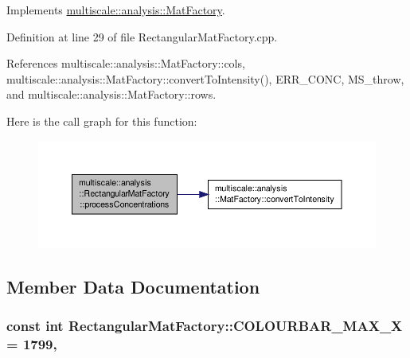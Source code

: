 Implements \hyperlink{classmultiscale_1_1analysis_1_1MatFactory_a0493c87d7b74619a95f14c0e31a3e178}{multiscale\-::analysis\-::\-Mat\-Factory}.



Definition at line 29 of file Rectangular\-Mat\-Factory.\-cpp.



References multiscale\-::analysis\-::\-Mat\-Factory\-::cols, multiscale\-::analysis\-::\-Mat\-Factory\-::convert\-To\-Intensity(), E\-R\-R\-\_\-\-C\-O\-N\-C, M\-S\-\_\-throw, and multiscale\-::analysis\-::\-Mat\-Factory\-::rows.



Here is the call graph for this function\-:\nopagebreak
\begin{figure}[H]
\begin{center}
\leavevmode
\includegraphics[width=350pt]{classmultiscale_1_1analysis_1_1RectangularMatFactory_a6cc84a4eadbab5046cb6eacba64f5ae4_cgraph}
\end{center}
\end{figure}




\subsection{Member Data Documentation}
\hypertarget{classmultiscale_1_1analysis_1_1RectangularMatFactory_a9a91307705bb2d4cc8e837718ce330a8}{
\subsubsection[{C\-O\-L\-O\-U\-R\-B\-A\-R\-\_\-\-M\-A\-X\-\_\-\-X}]{\setlength{\rightskip}{0pt plus 5cm}const int Rectangular\-Mat\-Factory\-::\-C\-O\-L\-O\-U\-R\-B\-A\-R\-\_\-\-M\-A\-X\-\_\-\-X = 1799\hspace{0.3cm}{\ttfamily [static]}, {\ttfamily [private]}}}\label{classmultiscale_1_1analysis_1_1RectangularMatFactory_a9a91307705bb2d4cc8e837718ce330a8}


